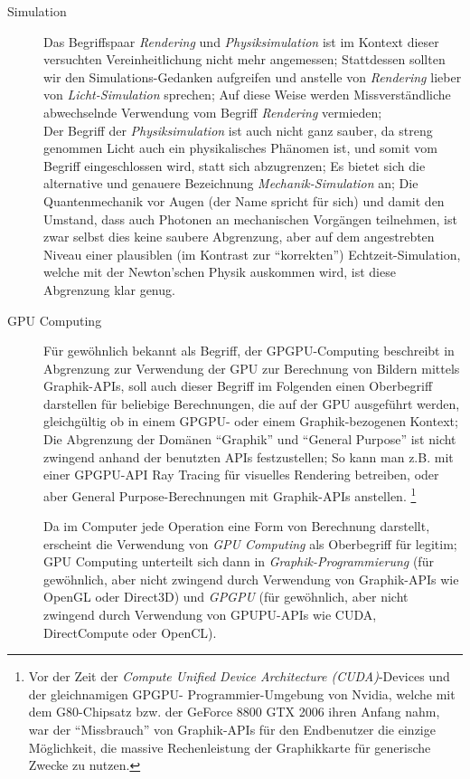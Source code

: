 \begin{description}
	\item[Simulation] Das Begriffspaar \emph{Rendering} und \emph{Physiksimulation} ist im Kontext dieser versuchten 
	Vereinheitlichung nicht mehr angemessen; Stattdessen sollten wir den Simulations-Gedanken aufgreifen und anstelle von
	\emph{Rendering} lieber von \emph{Licht-Simulation} sprechen; Auf diese Weise werden Missverständliche abwechselnde 
	Verwendung vom Begriff \emph{Rendering} vermieden;\\
	Der Begriff der \emph{Physiksimulation} ist auch nicht ganz sauber, da streng genommen Licht auch ein physikalisches
	Phänomen ist, und somit vom Begriff eingeschlossen wird, statt sich abzugrenzen; Es bietet sich die alternative und 
	genauere  Bezeichnung \emph{Mechanik-Simulation} an; Die Quantenmechanik vor Augen (der Name spricht für sich) und 
	damit den Umstand, dass auch Photonen an mechanischen Vorgängen teilnehmen, ist zwar selbst dies keine saubere 	
	Abgrenzung, aber auf dem angestrebten Niveau einer plausiblen (im Kontrast zur "`korrekten"') Echtzeit-Simulation, 
	welche mit der Newton'schen Physik auskommen wird, ist diese Abgrenzung klar genug.
	
	\item[GPU Computing]
	Für gewöhnlich bekannt als Begriff, der GPGPU-Computing beschreibt in Abgrenzung zur Verwendung der GPU zur Berechnung 
	von	Bildern mittels Graphik-APIs, soll auch dieser Begriff im Folgenden einen Oberbegriff darstellen für beliebige
	Berechnungen, die auf der GPU ausgeführt werden, gleichgültig ob in einem GPGPU- oder einem Graphik-bezogenen Kontext;
	Die Abgrenzung der Domänen "`Graphik"' und "`General Purpose"' ist nicht zwingend anhand der benutzten APIs 
	festzustellen; So kann man z.B. mit einer GPGPU-API Ray Tracing für visuelles Rendering betreiben, oder aber 
	General Purpose-Berechnungen mit Graphik-APIs anstellen.
	\footnote{Vor der Zeit der \emph{Compute Unified Device Architecture (CUDA)}-Devices und der gleichnamigen GPGPU-
	Programmier-Umgebung von Nvidia, welche mit dem G80-Chipsatz bzw. der GeForce 8800 GTX 2006 ihren Anfang nahm, war
	der "`Missbrauch"' von Graphik-APIs für den Endbenutzer die einzige Möglichkeit, die massive Rechenleistung der
	Graphikkarte für generische Zwecke zu nutzen.}
	
	Da im Computer jede Operation eine Form von Berechnung darstellt, erscheint die Verwendung von \emph{GPU Computing}
	als Oberbegriff für legitim; GPU Computing unterteilt sich dann in \emph{Graphik-Programmierung} (für gewöhnlich, aber 
	nicht zwingend durch Verwendung von Graphik-APIs wie OpenGL oder Direct3D) und \emph{GPGPU} (für gewöhnlich, aber 
	nicht zwingend durch Verwendung von GPUPU-APIs wie CUDA, DirectCompute oder OpenCL).
		

	
\end{description}

